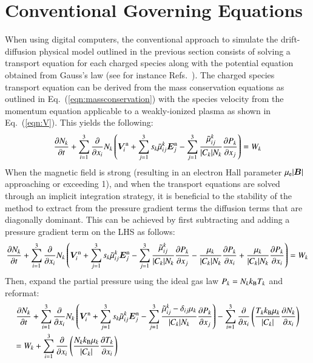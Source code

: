 \documentclass[twoside,onecolumn,10pt]{waflarticle}
\renewcommand{\vec}[1]{\bm{#1}}
\newcommand{\alb}{\vspace{0.1cm}\\} %
\newcommand{\mfd}{\displaystyle}
\newcommand{\nd}{3}
\renewcommand{\vec}[1]{\bm{ #1 }}
\begin{document}
\section{Conventional Governing Equations}

When using digital computers, the conventional approach to simulate the drift-diffusion physical model outlined in the previous section  consists of solving a transport equation for each charged species along with the potential equation obtained from Gauss's law (see for instance Refs.\ \cite{jcp:2004:surzhikov,jpp:2008:poggie,jap:2009:shang,book:2012:surzhikov,aiaaconf:2014:surzhikov}). The charged species transport equation can be derived from the mass conservation equations as outlined in Eq.\ (\ref{eqn:massconservation}) with the species velocity from the momentum equation applicable to a weakly-ionized plasma as shown in Eq.\ (\ref{eqn:V}). This  yields the following:
%
\begin{equation}
  \frac{\partial N_k}{\partial t} + \sum_{i=1}^3 \frac{\partial}{\partial x_i} N_k\left(\vec{V}^{\rm n}_i+\sum_{j=1}^\nd s_k \wtilde{\mu}^k_{ij}  \vec{E}_j^{\rm n}
             - \sum_{j=1}^\nd  \frac{\wtilde{\mu}^{k}_{ij}}{|C_k| N_k} \frac{\partial P_k}{\partial x_j}\right) = W_k
\end{equation}
%
When the magnetic field is strong (resulting in an electron Hall parameter $\mu_{\rm e}|\vec{B}|$ approaching or exceeding 1), and when the transport equations are solved through an implicit integration strategy, it is beneficial to the stability of the method to extract from the pressure gradient terms the diffusion terms that are diagonally dominant. This can be achieved by first subtracting and adding a pressure gradient term on the LHS as follows:
%
\begin{equation}
  \frac{\partial N_k}{\partial t} + \sum_{i=1}^3 \frac{\partial}{\partial x_i} N_k\left(\vec{V}^{\rm n}_i+\sum_{j=1}^\nd s_k \wtilde{\mu}^k_{ij}  \vec{E}_j^{\rm n}
             - \sum_{j=1}^\nd  \frac{\wtilde{\mu}^{k}_{ij}}{|C_k| N_k} \frac{\partial P_k}{\partial x_j}
-\frac{\mu_k}{|C_k| N_k} \frac{\partial P_k}{\partial x_i} +\frac{\mu_k}{|C_k| N_k} \frac{\partial P_k}{\partial x_i}
\right) = W_k
\end{equation}
%
Then, expand the partial pressure using the ideal gas law $P_k=N_k k_{\rm B} T_k$ and reformat:
%
\begin{equation}
\begin{array}{l}\mfd
  \frac{\partial N_k}{\partial t} + \sum_{i=1}^3 \frac{\partial}{\partial x_i} N_k\left(\vec{V}^{\rm n}_i+\sum_{j=1}^\nd s_k \wtilde{\mu}^k_{ij}  \vec{E}_j^{\rm n}
             - \sum_{j=1}^\nd  \frac{\wtilde{\mu}^{k}_{ij}-\delta_{ij} \mu_k}{|C_k| N_k} \frac{\partial P_k}{\partial x_j}\right)
-\sum_{i=1}^3 \frac{\partial}{\partial x_i} \left(\frac{T_k k_{\rm B} \mu_k}{|C_k| } \frac{\partial N_k}{\partial x_i} \right)\alb\mfd
=W_k+
\sum_{i=1}^3 \frac{\partial}{\partial x_i} \left(\frac{N_k k_{\rm B} \mu_k}{|C_k| } \frac{\partial T_k}{\partial x_i}
\right)  
\end{array}
\end{equation}
\end{document}

